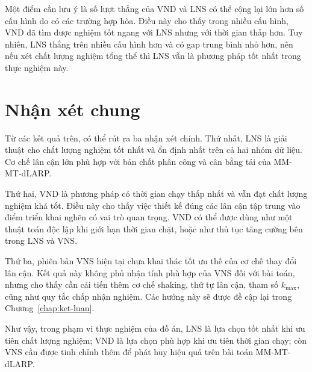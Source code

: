 Một điểm cần lưu ý là số lượt thắng của VND và LNS có thể cộng lại lớn hơn số cấu hình do có các trường hợp hòa. Điều này cho thấy trong nhiều cấu hình, VND đã tìm được nghiệm tốt ngang với LNS nhưng với thời gian thấp hơn. Tuy nhiên, LNS thắng trên nhiều cấu hình hơn và có gap trung bình nhỏ hơn, nên nếu xét chất lượng nghiệm tổng thể thì LNS vẫn là phương pháp tốt nhất trong thực nghiệm này.

\section{Nhận xét chung}
\label{sec:experiment-discussion}

Từ các kết quả trên, có thể rút ra ba nhận xét chính. Thứ nhất, LNS là giải thuật cho chất lượng nghiệm tốt nhất và ổn định nhất trên cả hai nhóm dữ liệu. Cơ chế lân cận lớn phù hợp với bản chất phân công và cân bằng tải của MM-MT-dLARP.

Thứ hai, VND là phương pháp có thời gian chạy thấp nhất và vẫn đạt chất lượng nghiệm khá tốt. Điều này cho thấy việc thiết kế đúng các lân cận tập trung vào điểm triển khai nghẽn có vai trò quan trọng. VND có thể được dùng như một thuật toán độc lập khi giới hạn thời gian chặt, hoặc như thủ tục tăng cường bên trong LNS và VNS.

Thứ ba, phiên bản VNS hiện tại chưa khai thác tốt ưu thế của cơ chế thay đổi lân cận. Kết quả này không phủ nhận tính phù hợp của VNS đối với bài toán, nhưng cho thấy cần cải tiến thêm cơ chế shaking, thứ tự lân cận, tham số \(k_{\max}\), cũng như quy tắc chấp nhận nghiệm. Các hướng này sẽ được đề cập lại trong Chương~\ref{chap:ket-luan}.

Như vậy, trong phạm vi thực nghiệm của đồ án, LNS là lựa chọn tốt nhất khi ưu tiên chất lượng nghiệm; VND là lựa chọn phù hợp khi ưu tiên thời gian chạy; còn VNS cần được tinh chỉnh thêm để phát huy hiệu quả trên bài toán MM-MT-dLARP.